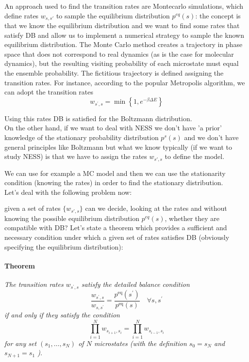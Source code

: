 \documentclass[\main/main.tex]{subfiles}
\begin{document}
An approach used to find the transition rates are Montecarlo simulations, which define rates $w_{s,s'}$ to sample the equilibrium distribution $p^{eq}(s)$: the concept is that we know the equilibrium distribution and we want to find some rates that satisfy DB and allow us to implement a numerical strategy to sample the known equilibrium distribution.
The Monte Carlo method creates a trajectory in phase space that does not correspond to real dynamics (as is the case for molecular dynamics), but the resulting visiting probability of each microstate must equal the ensemble probability. The fictitious trajectory is defined assigning the transition rates. For instance, according to the popular Metropolis algorithm, we can adopt the transition rates
\begin{equation}
    w_{s^{\prime}, s}=\min \left\{1, e^{-\beta\Delta E}\right \}
\end{equation}

Using this rates DB is satisfied for the Boltzmann distribution. \\

On the other hand, if we want to deal with NESS we don't have 'a prior' knowledge of the stationary probability distribution $p^s(s)$ and we don't have general principles like Boltzmann but what we know typically (if we want to study NESS) is that we have to assign the rates $w_{s',s}$ to define the model.

We can use for example a MC model and then we can use the stationarity condition (knowing the rates) in order to find the stationary distribution. \\

Let's deal with the following problem now:

given a set of rates $\{w_{s',s}\}$ can we decide, looking at the rates and without knowing the possible equilibrium distribution $p^{eq}(s)$, whether they are compatible with DB? Let's state a theorem which provides a sufficient and necessary condition under which a given set of rates satisfies DB (obviously specifying the equilibrium distribution):

\paragraph{Theorem}
\label{theor}
\textit{
The transition rates $w_{s^{\prime}, s}$ satisfy the detailed balance condition
$$
\frac{w_{s^{\prime}, s}}{w_{s, s^{\prime}}}=\frac{p^{\mathrm{eq}}\left(s^{\prime}\right)}{p^{\mathrm{eq}}(s)} \quad \boxed{\forall s, s^{\prime}}
$$
if and only if they satisfy the condition
\begin{equation}
    \prod_{i=1}^{N} w_{s_{i+1}, s_{i}}=\prod_{i=1}^{N} w_{s_{i-1}, s_{i}}
    \label{eq:teorema}
\end{equation}
for any set $\left(s_{1}, \ldots, s_{N}\right)$ of $N$ microstates (with the definition $s_{0}=s_{N}$ and $s_{N+1}=s_{1}$ ).} \\
\end{document}
